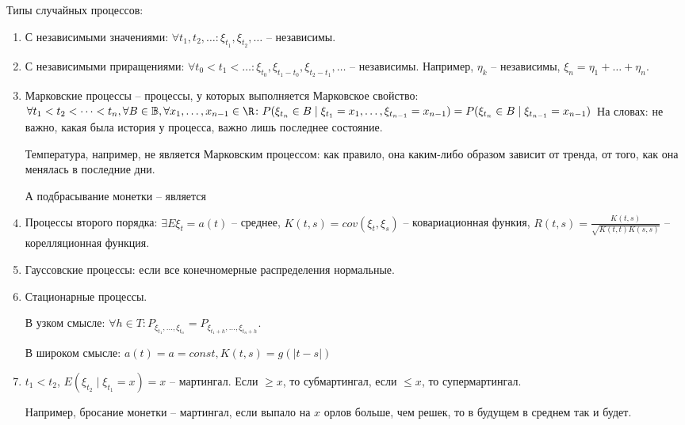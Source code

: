 Типы случайных процессов:
\begin{enumerate}
\item С независимыми значениями: $\forall t_1, t_2, \dots \colon \xi_{t_1}, \xi_{t_2}, \dots$ -- независимы.

\item С независимыми приращениями: $\forall t_0 < t_1 < \dots \colon \xi_{t_0}, \xi_{t_1 - t_0}, \xi_{t_2 - t_1}, \dots$ -- независимы.
Например, $\eta_k$ -- независимы, $\xi_n = \eta_1 + \dots + \eta_n$.

\item Марковские процессы -- процессы, у которых выполняется Марковское свойство: 
$\forall t_1 < t_2 < \dots < t_n, \forall B \in \mathbb{B}, \forall x_1, \dots, x_{n-1} \in \R \colon P(\xi_{t_n} \in B \mid \xi_{t_1} = x_1, \dots, \xi_{t_{n-1}} = x_{n-1}) = P(\xi_{t_n} \in B \mid \xi_{t_{n-1}} = x_{n-1})$
На словах: не важно, какая была история у процесса, важно лишь последнее состояние.
\begin{exmp}
Температура, например, не является Марковским процессом: как правило, она каким-либо образом зависит от тренда, от того, как она менялась в последние дни.
\end{exmp}                                                                                                                                                                                 
\begin{exmp}
А подбрасывание монетки -- является
\end{exmp}
\item Процессы второго порядка: $\exists E \xi_t = a(t)$ -- среднее, $K(t, s) = cov(\xi_t, \xi_s)$ -- ковариационная функия, $R(t, s) = \frac{K(t, s)}{\sqrt{K(t, t)K(s, s)}}$ --корелляционная функция.

\item Гауссовские процессы: если все конечномерные распределения нормальные.

\item Стационарные процессы. 

В узком смысле: $\forall h \in T\colon P_{\xi_{t_1}, \dots, \xi_{t_n}} = P_{\xi_{t_1 + h}, \dots, \xi_{t_n + h}}$.

В широком смысле: $a(t) = a = const, K(t, s) = g(|t - s|)$

\item $t_1 < t_2$, $E(\xi_{t_2} \mid \xi_{t_1} = x) = x$ -- мартингал. Если $\geq x$, то субмартингал, если $\leq x$, то супермартингал.
\begin{exmp}
Например, бросание монетки -- мартингал, если выпало на $x$ орлов больше, чем решек, то в будущем в среднем так и будет.
\end{exmp}

\end{enumerate}

